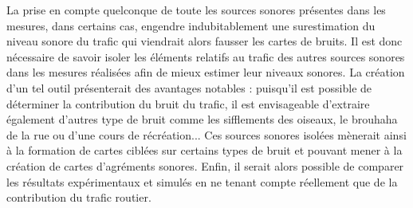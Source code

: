 La prise en compte quelconque de toute les sources sonores présentes dans les mesures, dans certains cas, engendre indubitablement une surestimation du niveau sonore du trafic qui viendrait alors fausser les cartes de bruits. Il est donc nécessaire de savoir isoler les éléments relatifs au trafic des autres sources sonores dans les mesures réalisées afin de mieux estimer leur niveaux sonores. La création d'un tel outil présenterait des avantages notables : puisqu'il est possible de déterminer la contribution du bruit du trafic, il est envisageable d'extraire également d'autres type de bruit comme les sifflements des oiseaux, le brouhaha de la rue ou d'une cours de récréation... Ces sources sonores isolées mènerait ainsi à la formation de cartes ciblées sur certains types de bruit et pouvant mener à la création de cartes d'agréments sonores. Enfin, il serait alors possible de comparer les résultats expérimentaux et simulés en ne tenant compte réellement que de la contribution du trafic routier.

%
%
%
% 